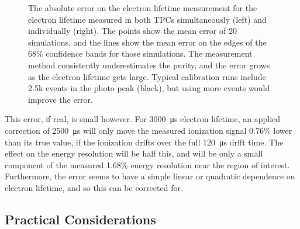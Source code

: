 \documentclass[herrin-thesis.tex]{subfiles}
\begin{document}
\begin{figure}[htbp]
\begin{subfigure}[b]{0.5\linewidth}
\end{subfigure}
\caption[Error on reconstructed electron lifetime from simulation]{The absolute error on the electron lifetime measurement for the electron lifetime measured in both TPCs simultaneously (left) and individually (right). The points show the mean error of 20 simulations, and the lines show the mean error on the edges of the 68\% confidence bands for those simulations. The measurement method consistently underestimates the purity, and the error grows as the electron lifetime gets large. Typical calibration runs include 2.5k events in the photo peak (black), but using more events would improve the error.}
\label{fig:sim_err}
\end{figure}

This error, if real, is small however. For \SI{3000}{\micro\second} electron lifetime, an applied correction of  \SI{2500}{\micro\second} will only move the measured ionization signal 0.76\% lower than its true value, if the ionization drifts over the full  \SI{120}{\micro\second}  drift time. The effect on the energy resolution will be half this, and will be only a small component of the measured 1.68\% energy resolution  near the \zeronu region of interest. Furthermore, the error seems to have a simple linear or quadratic dependence on electron lifetime, and so this can be corrected for.

\subsection{Practical Considerations}
\end{document}
